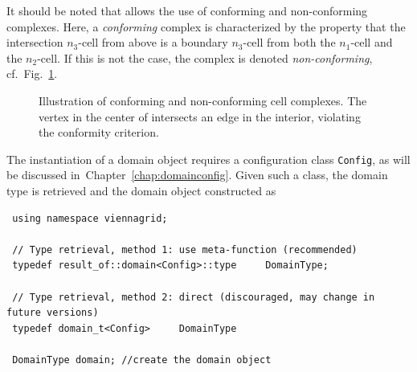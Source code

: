 It should be noted that {\ViennaGrid} allows the use of conforming and non-conforming complexes. Here, a \emph{conforming} complex is characterized by the property that the intersection $n_3$-cell from above is a boundary $n_3$-cell from both the $n_1$-cell and the $n_2$-cell. If this is not the case, the complex is denoted \emph{non-conforming}, cf.~Fig.~\ref{fig:conformity}.

\begin{figure}[tb]
\centering 
    \hspace*{1cm}
 \caption{Illustration of conforming and non-conforming cell complexes. The vertex in the center of  intersects an edge in the interior, violating the conformity criterion.}
 \label{fig:conformity}
\end{figure}

The instantiation of a {\ViennaGrid} domain object requires a configuration class \lstinline|Config|, as will be discussed in~Chapter~\ref{chap:domainconfig}. Given such a class, the domain type is retrieved and the domain object constructed as 
\begin{lstlisting}
 using namespace viennagrid;

 // Type retrieval, method 1: use meta-function (recommended)
 typedef result_of::domain<Config>::type     DomainType;

 // Type retrieval, method 2: direct (discouraged, may change in future versions)
 typedef domain_t<Config>     DomainType

 DomainType domain; //create the domain object
\end{lstlisting}



